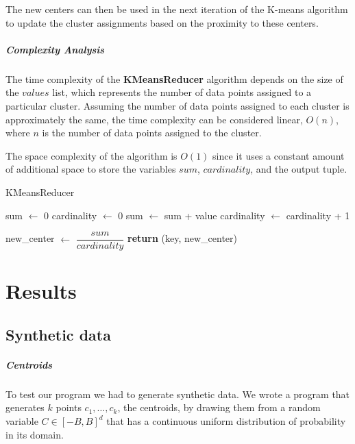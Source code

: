 \documentclass[parskip=full]{report}
\begin{document}
The new centers can then be used in the next iteration of the K-means algorithm to update the cluster assignments based on the proximity to these centers.

\paragraph{Complexity Analysis}

The time complexity of the \textbf{KMeansReducer} algorithm depends on the size of the $values$ list, which represents the number of data points assigned to a particular cluster. Assuming the number of data points assigned to each cluster is approximately the same, the time complexity can be considered linear, $O(n)$, where $n$ is the number of data points assigned to the cluster.

The space complexity of the algorithm is $O(1)$ since it uses a constant amount of additional space to store the variables $sum$, $cardinality$, and the output tuple.


\begin{algorithm}[H]
	\caption{KMeansReducer}\label{algo:kmeans-reducer}
	\begin{algorithmic}[1]
		\State sum $\gets$ 0
		\State cardinality $\gets$ 0
		\State sum $\gets$ sum + value
		\State cardinality $\gets$ cardinality + 1
		\EndFor

		\State new\_center $\gets$  $\dfrac{sum}{cardinality}$
		\State \textbf{return} (key, new\_center)
		\EndProcedure
	\end{algorithmic}
\end{algorithm}

\chapter{Results}

\section{Synthetic data}

\paragraph{Centroids}
To test our program we had to generate synthetic data. We wrote a program that 
generates $k$ points $c_1, \dots, c_k$, the centroids, by drawing them from a 
random variable 
$C \in \left[-B,B\right]^d$ that has a continuous uniform distribution of 
probability in its domain. 
\end{document}
